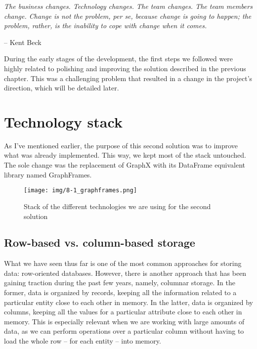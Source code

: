 \epigraph{\textit{The business changes. Technology changes. The team changes. The team members change. Change is not the problem, per se, because change is going to happen; the problem, rather, is the inability to cope with change when it comes.}}{-- \textup{Kent Beck}}

During the early stages of the development, the first steps we followed were highly related to polishing and improving the solution described in the previous chapter. This was a challenging problem that resulted in a change in the project's direction, which will be detailed later.

\section{Technology stack}

As I've mentioned earlier, the purpose of this second solution was to improve what was already implemented. This way, we kept most of the stack untouched. The sole change was the replacement of GraphX with its DataFrame equivalent library named GraphFrames.

\begin{figure}[ht]
    \centering
    \texttt{[image: img/8-1\_graphframes.png]}
    \caption[Stack of the different technologies we are using for the second solution]{Stack of the different technologies we are using for the second solution\footnotemark}
\end{figure}


\subsection{Row-based vs. column-based storage}

What we have seen thus far is one of the most common approaches for storing data: row-oriented databases. However, there is another approach that has been gaining traction during the past few years, namely, columnar storage. In the former, data is organized by records, keeping all the information related to a particular entity close to each other in memory. In the latter, data is organized by columns, keeping all the values for a particular attribute close to each other in memory. This is especially relevant when we are working with large amounts of data, as we can perform operations over a particular column without having to load the whole row -- for each entity -- into memory.


